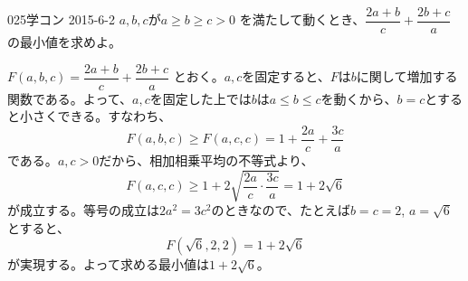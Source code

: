\begin{prob}{025}{}{学コン 2015-6-2}
 $a,b,c$が$a \ge b \ge c > 0$ を満たして動くとき、$\dfrac{2a+b}{c}+\dfrac{2b+c}{a}$の最小値を求めよ。
\end{prob}
$F(a, b, c)=\dfrac{2a+b}{c}+\dfrac{2b+c}{a}$ とおく。$a, c$を固定すると、$F$は$b$に関して増加する関数である。よって、$a, c$を固定した上では$b$は$a\le b\le c$を動くから、$b=c$とすると小さくできる。すなわち、
\[ F(a, b, c)\ge F(a, c, c)=1+\frac{2a}{c}+\frac{3c}{a} \]
である。$a, c>0$だから、相加相乗平均の不等式より、
\[ F(a, c, c)\ge 1+2\sqrt{\frac{2a}{c}\cdot\frac{3c}{a}}=1+2\sqrt{6} \]
が成立する。等号の成立は$2a^2=3c^2$のときなので、たとえば$b=c=2$, $a=\sqrt{6}$とすると、
\[ F(\sqrt{6}, 2, 2)=1+2\sqrt{6} \]
が実現する。よって求める最小値は$1+2\sqrt{6}$。